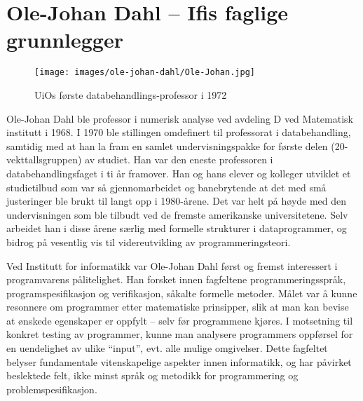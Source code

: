 \chapter[Ole-Johan Dahl]{Ole-Johan Dahl – Ifis faglige grunnlegger}

\author{Skrevet av Narve Trædal}

\begin{figure}[h!]
	\texttt{[image: images/ole-johan-dahl/Ole-Johan.jpg]}
	\label{fig:ole-johan}
	\caption{UiOs første databehandlings-professor i 1972}
\end{figure}

Ole-Johan Dahl ble professor i numerisk analyse ved avdeling D ved Matematisk institutt i 1968. I 1970 ble stillingen omdefinert til professorat i databehandling, samtidig med at han la fram en samlet undervisningspakke for første delen (20-vekttallsgruppen) av studiet. Han var den eneste professoren i databehandlingsfaget i ti år framover. Han og hans elever og kolleger utviklet et studietilbud som var så gjennomarbeidet og banebrytende at det med små justeringer ble brukt til langt opp i 1980-årene. Det var helt på høyde med den undervisningen som ble tilbudt ved de fremste amerikanske universitetene. Selv arbeidet han i disse årene særlig med formelle strukturer i dataprogrammer, og bidrog på vesentlig vis til videreutvikling av programmeringsteori.

Ved Institutt for informatikk var Ole-Johan Dahl først og fremst interessert i programvarens pålitelighet. Han forsket innen fagfeltene programmeringsspråk, programspesifikasjon og verifikasjon, såkalte formelle metoder. Målet var å kunne resonnere om programmer etter matematiske prinsipper, slik at man kan bevise at ønskede egenskaper er oppfylt – selv før programmene kjøres. I motsetning til konkret testing av programmer, kunne man analysere programmers oppførsel for en uendelighet av ulike ``input'', evt. alle mulige omgivelser. Dette fagfeltet belyser fundamentale vitenskapelige aspekter innen informatikk, og har påvirket beslektede felt, ikke minst språk og metodikk for programmering og problemspesifikasjon.

